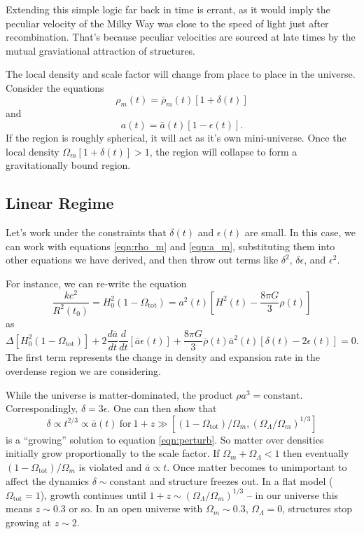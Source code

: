\documentclass[]{article}
\begin{document}
Extending this simple logic far back in time is errant, as it would
imply the peculiar velocity of the Milky Way was close to the speed
of light just after recombination.  That's because peculiar velocities are
sourced at late times by the mutual graviational attraction of structures.

The local density and scale factor will change from place to place in the
universe.  Consider the equations
\begin{equation}
\label{eqn:rho_m}
\rho_m(t) = \bar{\rho}_m(t)[1+\delta(t)]
\end{equation}
\noindent
and
\begin{equation}
\label{eqn:a_m}
a(t) = \bar{a}(t)[1 - \epsilon(t)].
\end{equation}
\noindent
If the region is roughly spherical, it will act as it's own mini-universe.
Once the local density $\Omega_m[1+\delta(t)]>1$, the region will collapse to
form a gravitationally bound region.

\subsection{Linear Regime}
Let's work under the constraints that $\delta(t)$ and $\epsilon(t)$ are 
small. In this case, we can work with equations \ref{eqn:rho_m} 
and \ref{eqn:a_m}, substituting them into other equations we have derived, 
and then throw out terms like $\delta^2$, $\delta\epsilon$, and $\epsilon^2$.

For instance, we can re-write the equation
\begin{equation}
\frac{kc^2}{R^2(t_0)} = H_0^2(1-\Omega_{\mathrm{tot}}) = a^2(t)\left[H^2(t) - \frac{8\pi G}{3}\rho(t)\right]
\end{equation}
\noindent
as
\begin{equation}
\label{eqn:perturb}
\Delta[H_0^2(1-\Omega_{\mathrm{tot}})] + 2 \frac{d\bar{a}}{dt}\frac{d}{dt}[\bar{a}\epsilon(t)] + \frac{8\pi G}{3}\bar{\rho}(t)\bar{a}^2(t)[\delta(t) - 2 \epsilon(t)] = 0.
\end{equation}
\noindent
The first term represents the change in density and expansion rate in the
overdense region we are considering.

While the universe is matter-dominated, the product $\rho a^3 = \mathrm{constant}$.  Correspondingly, $\delta = 3 \epsilon$.  One can then
show that
\begin{equation}
\delta \propto t^{2/3} \propto \bar{a}(t)~\mathrm{for}~1+z\gg[(1-\Omega_{\mathrm{tot}})/\Omega_m, (\Omega_\Lambda/\Omega_m)^{1/3}]
\end{equation}
\noindent
is a ``growing'' solution to equation \ref{eqn:perturb}.  So matter over
densities initially grow proportionally to the scale factor.  If $\Omega_m + \Omega_\Lambda < 1$ then eventually $(1-\Omega_{\mathrm{tot}})/\Omega_m$ is violated and $\bar{a}\propto t$.  Once matter becomes to unimportant to 
affect the dynamics $\delta\sim\mathrm{constant}$ and structure freezes out.
In a flat model ($\Omega_{\mathrm{tot}}=1$), growth continues until 
$1+z\sim(\Omega_\Lambda/\Omega_m)^{1/3}$ -- in our universe this means 
$z\sim0.3$ or 
so.  In an open universe with $\Omega_m\sim0.3$, $\Omega_\Lambda=0$, 
structures stop growing at $z\sim2$.
\end{document}
